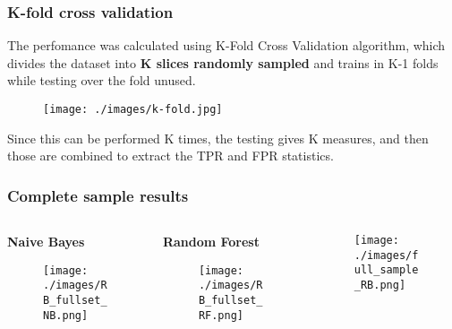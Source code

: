 \documentclass[10pt]{beamer}
\begin{document}
\begin{frame}\frametitle{K-fold cross validation}
 The perfomance was calculated using K-Fold Cross Validation algorithm, 
 which divides the dataset into \textbf{K slices randomly sampled} and trains
 in K-1 folds while testing over the fold unused. 
 \begin{figure}
 \texttt{[image: ./images/k-fold.jpg]}
\end{figure}
 Since this can be performed K times, the testing gives K measures, 
 and then those are combined to extract the TPR and FPR statistics.
\end{frame}
\begin{frame}[c, squeeze] \frametitle{Complete sample results}
\begin{columns}
\begin{column}{0.3\textwidth}
\begin{center}
\textbf{Naive Bayes} 
\begin{figure}
 \texttt{[image: ./images/RB\_fullset\_NB.png]}
\end{figure}
\end{center}
\end{column}
\begin{column}{0.3\textwidth}
\begin{center}
\textbf{Random Forest}
\begin{figure}
 \texttt{[image: ./images/RB\_fullset\_RF.png]}
\end{figure}

\end{center}
\end{column}
\begin{column}{0.34\textwidth}
 \begin{figure}
 \texttt{[image: ./images/full\_sample\_RB.png]}
\end{figure}
\end{column}
\end{columns}
\end{frame}
\end{document}
